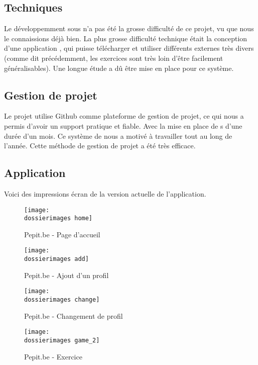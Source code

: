 \subsection{Techniques}
Le développemment sous \android{} n'a pas été la grosse difficulté de ce projet, vu que nous le connaissions déjà bien. La plus grosse difficulté technique était la conception d'une application \android{}, qui puisse télécharger et utiliser différents \plugins{} externes très divers (comme dit précédemment, les exercices sont très loin d'être facilement généralisables). Une longue étude a dû être mise en place pour ce système. 

\subsection{Gestion de projet}
Le projet utilise Github comme plateforme de gestion de projet, ce qui nous a permis d'avoir un support pratique et fiable.
Avec la mise en place de \sprint s d'une durée d'un mois. Ce système de \sprint{} nous a motivé à travailler tout au long de l'année. Cette méthode de gestion de projet a été très efficace.


\subsection{Application}
Voici des impressions écran de la version actuelle de l'application.
\begin{figure}[H]
   	\begin{minipage}[c]{.46\linewidth}
		\texttt{[image: \\dossierimages home]} 
		\caption{Pepit.be - Page d'accueil}
		\label{Pepit.be - Page d'accueil}
   	\end{minipage} \hfill
  	\begin{minipage}[c]{.46\linewidth}
      	\texttt{[image: \\dossierimages add]}
     	\caption{Pepit.be - Ajout d'un profil}
		\label{Pepit.be - Ajout d'un profil}
   	\end{minipage}
\end{figure}
\begin{figure}[H]
   	\begin{minipage}[c]{.46\linewidth}
		\texttt{[image: \\dossierimages change]} 
		\caption{Pepit.be - Changement de profil}
		\label{Pepit.be - Changement de profil}
   	\end{minipage} \hfill
  	\begin{minipage}[c]{.46\linewidth}
      	\texttt{[image: \\dossierimages game\_2]}
     	\caption{Pepit.be - Exercice}
		\label{Pepit.be - Exercice}
   	\end{minipage}
\end{figure}
